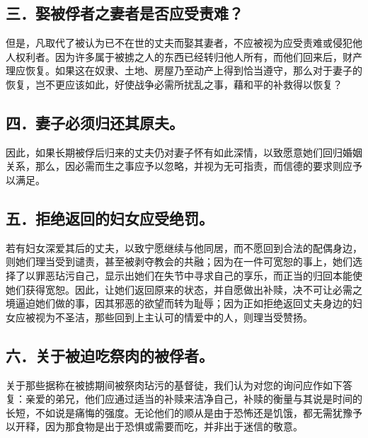 \subsection{三．娶被俘者之妻者是否应受责难？}

但是，凡取代了被认为已不在世的丈夫而娶其妻者，不应被视为应受责难或侵犯他人权利者。因为许多属于被掳之人的东西已经转归他人所有，而他们回来后，财产理应恢复。如果这在奴隶、土地、房屋乃至动产上得到恰当遵守，那么对于妻子的恢复，岂不更应该如此，好使战争必需所扰乱之事，藉和平的补救得以恢复？\par


\subsection{四．妻子必须归还其原夫。}

因此，如果长期被俘后归来的丈夫仍对妻子怀有如此深情，以致愿意她们回归婚姻关系，那么，因必需而生之事应予以忽略，并视为无可指责，而信德的要求则应予以满足。\par


\subsection{五．拒绝返回的妇女应受绝罚。}

若有妇女深爱其后的丈夫，以致宁愿继续与他同居，而不愿回到合法的配偶身边，则她们理当受到谴责，甚至被剥夺教会的共融；因为在一件可宽恕的事上，她们选择了以罪恶玷污自己，显示出她们在失节中寻求自己的享乐，而正当的归回本能使她们获得宽恕。因此，让她们返回原来的状态，并自愿做出补赎，决不可让必需之境逼迫她们做的事，因其邪恶的欲望而转为耻辱；因为正如拒绝返回丈夫身边的妇女应被视为不圣洁，那些回到上主认可的情爱中的人，则理当受赞扬。\par


\subsection{六．关于被迫吃祭肉的被俘者。}

关于那些据称在被掳期间被祭肉玷污的基督徒，我们认为对您的询问应作如下答复：亲爱的弟兄，他们应通过适当的补赎来洁净自己，补赎的衡量与其说是时间的长短，不如说是痛悔的强度。无论他们的顺从是由于恐怖还是饥饿，都无需犹豫予以开释，因为那食物是出于恐惧或需要而吃，并非出于迷信的敬意。\par

